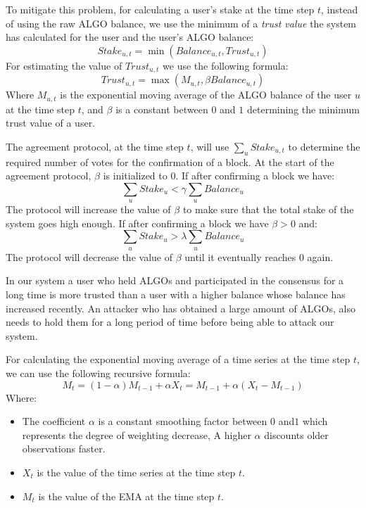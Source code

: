 \documentclass[11pt, A4]{report}
\begin{document}
    To mitigate this problem, for calculating a user's stake at the time step \(t\), instead of using the raw ALGO
    balance, we use the minimum of a \emph{trust value} the system has calculated for the user and the user's
    ALGO balance:
    \[
        Stake_{u,t} = \min (Balance_{u,t}, Trust_{u,t})
    \]
    For estimating the value of \(Trust_{u,t}\) we use the following formula:
    \[
        Trust_{u,t} = \max (M_{u,t}, \beta Balance_{u,t})
    \]
    Where \(M_{u,t}\) is the exponential moving average of the ALGO balance of the user \(u\) at the time step \(t\),
    and \(\beta\) is a constant between \(0\) and \(1\) determining the minimum trust value of a user.

    The agreement protocol, at the time step \(t\), will use \(\sum_{u}Stake_{u,t}\) to determine the required number of
    votes for the confirmation of a block. At the start of the agreement protocol, \(\beta\) is initialized to \(0\).
    If after confirming a block we have:
    \[
        \sum_{u}Stake_u < \gamma \sum_{u} Balance_u
    \]
    The protocol will increase the value of \(\beta\) to make sure that the total stake of the system goes high enough.
    If after confirming a block we have \(\beta > 0\) and:
    \[
        \sum_{u}Stake_u > \lambda \sum_{u} Balance_u
    \]
    The protocol will decrease the value of \(\beta\) until it eventually reaches \(0\) again.

    In our system a user who held ALGOs and participated in the consensus for a long time is more trusted
    than a user with a higher balance whose balance has increased recently. An attacker who has obtained a large
    amount of ALGOs, also needs to hold them for a long period of time before being able to attack our system.

    For calculating the exponential moving average of a time series at the time step \(t\), we can use the following
    recursive formula:
    \[
        M_t = (1 - \alpha) M_{t-1} + \alpha X_t = M_{t-1} + \alpha (X_t - M_{t-1})
    \]
    Where:
    \begin{itemize}
        \item The coefficient \(\alpha\) is a constant smoothing factor between \(0\) and\(1\) which represents the
        degree of weighting decrease, A higher \(\alpha\) discounts older observations faster.
        \item \(X_t\) is the value of the time series at the time step \(t\).
        \item \(M_t\) is the value of the EMA at the time step \(t\).
    \end{itemize}
\end{document}
